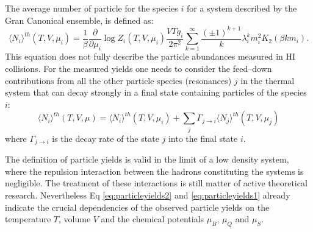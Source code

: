 The average number of particle for the species $i$ for a system described by the Gran
Canonical ensemble, is defined as:
\begin{equation} \label{eq:particleyields1}
    \langle N_{i} \rangle ^{th} (T,V,\mu_{i}) = \frac{1}{\beta} \frac{\partial}{\partial \mu_{i}}
    \log Z_{i}(T,V,\mu_{i})
    \frac{V T g_{i}}{2 \pi^{2}}
    \sum_{k=1}^{\infty} \frac{(\pm 1)^{k+1}}{k} \lambda^{k}_{i} m_{i}^{2} K_{2}(\beta k m_{i}).
\end{equation}
This equation does not fully describe the particle abundances measured in HI collisions.
For the measured yields one needs to consider the feed–down contributions from all the other
particle species (resonances) $j$ in the thermal system that can decay strongly in a final
state containing particles of the species $i$:
\begin{equation} \label{eq:particleyields2}
    \langle N_{i} \rangle ^{th} (T,V,\mu) = \langle N_{i} \rangle ^{th} (T,V,\mu_{i})
    + \sum_{j} \Gamma_{j \to i} \langle N_{j} \rangle ^{th} (T,V,\mu_{j})
\end{equation}
where $\Gamma_{j \to i}$ is the decay rate of the state $j$ into the final state $i$.

The definition of particle yields is valid in the limit of a low density system, 
where the repulsion interaction between the hadrons constituting the systems is negligible.
The treatment of these interactions is still matter of active theoretical research. Nevertheless 
Eq \ref{eq:particleyields2} and \ref{eq:particleyields1} already indicate the crucial 
dependencies of the observed particle yields on the
temperature $T$, volume $V$ and the chemical potentials $\mu_B$, $\mu_Q$ and $\mu_S$.


